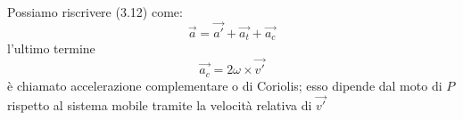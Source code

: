 \documentclass[class=book, crop=false, oneside, 12pt]{standalone}
\begin{document}
Possiamo riscrivere (3.12) come:
\begin{equation*}
    \overrightarrow{a} = \overrightarrow{a'} + \overrightarrow{a_t} + \overrightarrow{a_c}
\end{equation*}
l'ultimo termine
\begin{equation*}
    \overrightarrow{a_c} = 2 \omega \times \overrightarrow{v'}
\end{equation*}
è chiamato accelerazione complementare o di Coriolis; esso dipende dal moto di \(P\) rispetto al sistema mobile tramite la velocità relativa di \(\overrightarrow{v'}\)
\end{document}
